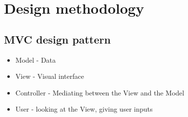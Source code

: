 \chapter{Design methodology}
\section{MVC design pattern}
\begin{itemize}
\item Model - Data
\item View - Visual interface
\item Controller - Mediating between the View and the Model
\item User - looking at the View, giving user inputs
\end{itemize}

      
    
    
  
  
  
  
  